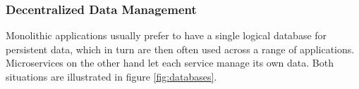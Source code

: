 






\subsubsection{Decentralized Data Management} 
\label{sec:decentralized}

Monolithic applications usually prefer to have a single logical
database for persistent data, which in turn are then often used across
a range of applications. Microservices on the other hand let each
service manage its own data. Both situations are illustrated in 
figure \ref{fig:databases}. \cite{ms-definition}

